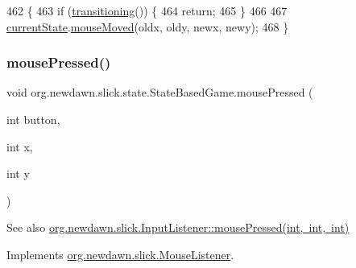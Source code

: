 \begin{DoxyCode}
462                                                                    \{
463         \textcolor{keywordflow}{if} (\mbox{\hyperlink{classorg_1_1newdawn_1_1slick_1_1state_1_1_state_based_game_ae869c08778875776081935a090d4c92f}{transitioning}}()) \{
464             \textcolor{keywordflow}{return};
465         \}
466         
467         \mbox{\hyperlink{classorg_1_1newdawn_1_1slick_1_1state_1_1_state_based_game_a6a45e68094bb9b7ec30b8a8b7d415766}{currentState}}.\mbox{\hyperlink{interfaceorg_1_1newdawn_1_1slick_1_1_mouse_listener_ad41216afc84f2c8d38f91e8b2d46bed9}{mouseMoved}}(oldx, oldy, newx, newy);
468     \}
\end{DoxyCode}
\mbox{\label{classorg_1_1newdawn_1_1slick_1_1state_1_1_state_based_game_ab6809563aa70d14d4ed26294d248e871}} 
\subsubsection{\texorpdfstring{mouse\+Pressed()}{mousePressed()}}
{\footnotesize\ttfamily void org.\+newdawn.\+slick.\+state.\+State\+Based\+Game.\+mouse\+Pressed (\begin{DoxyParamCaption}\item[{int}]{button,  }\item[{int}]{x,  }\item[{int}]{y }\end{DoxyParamCaption})\hspace{0.3cm}{\ttfamily [inline]}}

\begin{DoxySeeAlso}{See also}
\mbox{\hyperlink{interfaceorg_1_1newdawn_1_1slick_1_1_mouse_listener_aeca4c21a38aa31c408f3daf6f86c0925}{org.\+newdawn.\+slick.\+Input\+Listener\+::mouse\+Pressed(int, int, int)}} 
\end{DoxySeeAlso}


Implements \mbox{\hyperlink{interfaceorg_1_1newdawn_1_1slick_1_1_mouse_listener_aeca4c21a38aa31c408f3daf6f86c0925}{org.\+newdawn.\+slick.\+Mouse\+Listener}}.


